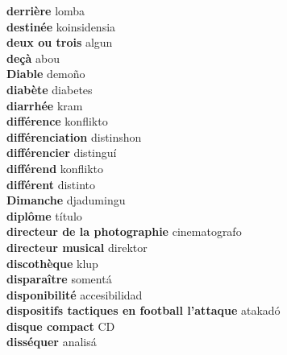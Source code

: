 \textbf{ derrière  } lomba \\
\textbf{ destinée  } koinsidensia \\
\textbf{ deux ou trois  } algun \\
\textbf{ deçà  } abou \\
\textbf{ Diable  } demoño \\
\textbf{ diabète  } diabetes \\
\textbf{ diarrhée  } kram \\
\textbf{ différence  } konflikto \\
\textbf{ différenciation  } distinshon \\
\textbf{ différencier  } distinguí \\
\textbf{ différend  } konflikto \\
\textbf{ différent  } distinto \\
\textbf{ Dimanche  } djadumingu \\
\textbf{ diplôme  } título \\
\textbf{ directeur de la photographie  } cinematografo \\
\textbf{ directeur musical  } direktor \\
\textbf{ discothèque  } klup \\
\textbf{ disparaître  } somentá \\
\textbf{ disponibilité  } accesibilidad \\
\textbf{ dispositifs tactiques en football l’attaque  } atakadó \\
\textbf{ disque compact  } CD \\
\textbf{ disséquer  } analisá \\
